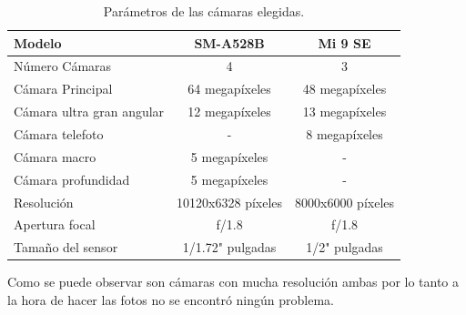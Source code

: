 \begin{table}[ht]
	\centering
	{
		\begin{tabular}{@{}lcc@{}}
			\toprule
			Modelo						& 	SM-A528B			&	Mi 9 SE	 	\\ \midrule
			Número Cámaras 				& 	4           		& 	3           	\\
			Cámara Principal			&  64 megapíxeles   	& 48 megapíxeles         	 	\\
			Cámara ultra gran angular 	&  12 megapíxeles		& 13 megapíxeles	\\
			Cámara telefoto		 		&  -					& 8 megapíxeles		\\
			Cámara macro			 	&  5 megapíxeles		& -					\\
			Cámara profundidad		 	&  5 megapíxeles		& -					\\
			Resolución					&  10120x6328 píxeles	& 8000x6000 píxeles		\\
			Apertura focal				&	f/1.8				& f/1.8					\\
			Tamaño del sensor			& 1/1.72" pulgadas		& 1/2" pulgadas			\\ \bottomrule
		\end{tabular}
	}
	\caption{Parámetros de las cámaras elegidas.}
	\label{tablacamara}
\end{table}
\FloatBarrier

Como se puede observar son cámaras con mucha resolución ambas por lo tanto a la hora de hacer las fotos no se encontró ningún problema.


